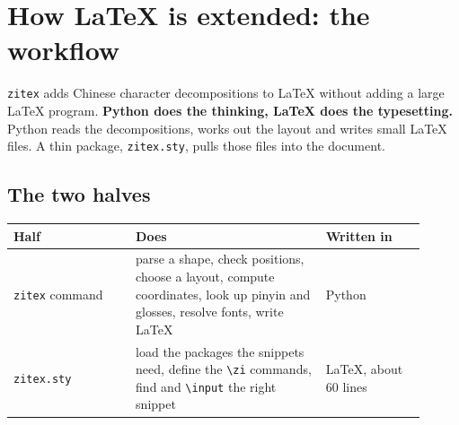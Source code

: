 \documentclass[11pt]{article}
\newcommand{\cmd}[1]{\texttt{\textbackslash #1}}               %
\begin{document}
\appendix
\section{How \LaTeX{} is extended: the workflow}
\texttt{zitex} adds Chinese character decompositions to \LaTeX{} without adding a large \LaTeX{} program.
\textbf{Python does the thinking, \LaTeX{} does the typesetting.} Python reads the decompositions, works out the
layout and writes small \LaTeX{} files. A thin package, \texttt{zitex.sty}, pulls those files into the document.

\subsection{The two halves}
\begin{center}
\small
{}
\end{center}

\begin{center}
\small
\begin{tabular}{@{}p{0.27\linewidth}p{0.42\linewidth}p{0.22\linewidth}@{}}
\toprule
Half & Does & Written in \\
\midrule
\texttt{zitex} command & parse a shape, check positions, choose a layout, compute coordinates, look up pinyin and glosses, resolve fonts, write \LaTeX{} & Python \\
\texttt{zitex.sty} & load the packages the snippets need, define the \cmd{zi} commands, find and \cmd{input} the right snippet & \LaTeX{}, about 60 lines \\
\bottomrule
\end{tabular}
\end{center}
\end{document}
